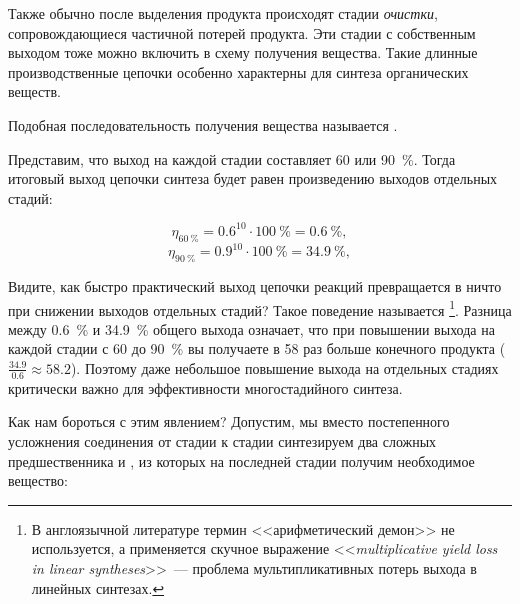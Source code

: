 
Также обычно после выделения продукта происходят стадии \emph{очистки}, сопровождающиеся частичной потерей продукта. Эти стадии с собственным выходом тоже можно включить в схему получения вещества. Такие длинные производственные цепочки особенно характерны для синтеза органических веществ.

Подобная последовательность получения вещества называется .

Представим, что выход на каждой стадии составляет 60 или \qty{90}{\percent}. Тогда итоговый выход цепочки синтеза будет равен произведению выходов отдельных стадий:

\begin{equation*}
    \eta_{\qty{60}{\percent}} = \num{0,6}^{10} \cdot \qty{100}{\percent} = \qty{0,6}{\percent},
\end{equation*}
\begin{equation*}
    \eta_{\qty{90}{\percent}} = \num{0,9}^{10} \cdot \qty{100}{\percent} = \qty{34,9}{\percent},
\end{equation*}

Видите, как быстро практический выход цепочки реакций превращается в ничто при снижении выходов отдельных стадий? Такое поведение называется \footnote{В англоязычной литературе термин <<арифметический демон>> не используется, а применяется скучное выражение <<\textit{multiplicative yield loss in linear syntheses}>>~--- проблема мультипликативных потерь выхода в линейных синтезах.}. Разница между \qty{0,6}{\percent} и \qty{34,9}{\percent} общего выхода означает, что при повышении выхода на каждой стадии с 60 до \qty{90}{\percent} вы получаете в 58 раз больше конечного продукта ($\frac{\num{34,9}}{\num{0,6}} \approx \num{58,2}$). Поэтому даже небольшое повышение выхода на отдельных стадиях критически важно для эффективности многостадийного синтеза.

Как нам бороться с этим явлением? Допустим, мы вместо постепенного усложнения соединения от стадии к стадии синтезируем два сложных предшественника  и , из которых на последней стадии получим необходимое вещество:


